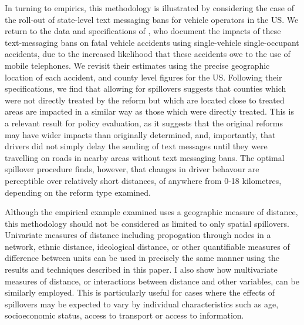 \documentclass[12pt]{article}
\begin{document}
\begin{spacing}{1.3}
In turning to empirics, this methodology is illustrated by considering the
case of the roll-out of state-level text messaging bans for vehicle operators
in the US.  We return to the data and specifications of
\citet{AboukAdams2013}, who document the impacts of these text-messaging
bans on fatal vehicle accidents using single-vehicle single-occupant
accidents, due to the increased likelihood that these accidents owe to
the use of mobile telephones.  We revisit their estimates using the precise
geographic location of each accident, and county level figures for the US.
Following their specifications, we find that allowing for spillovers suggests
that counties which were not directly treated by the reform but which are
located close to treated areas are impacted in a similar way as those
which were directly treated.  This is a relevant result for policy evaluation,
as it suggests that the original reforms may have wider impacts than originally
determined, and, importantly, that drivers did not simply delay the sending
of text messages until they were travelling on roads in nearby areas without
text messaging bans.  The optimal spillover procedure finds, however, that
changes in driver behavour are perceptible over relatively short distances,
of anywhere from 0-18 kilometres, depending on the reform type examined.

Although the empirical example examined uses a geographic measure of distance,
this methodology should not be considered as limited to only spatial spillovers.
Univariate measures of distance including propogation through nodes in a
network, ethnic distance, ideological distance, or other quantifiable measures
of difference between units can be used in precisely the same manner using the
results and techniques described in this paper.  I also show how multivariate
measures of distance, or interactions between distance and other variables, can
be similarly employed.  This is particularly useful for cases where the effects
of spillovers may be expected to vary by individual characteristics such as age,
socioeconomic status, access to transport or access to information.


\end{spacing}
\end{document}
